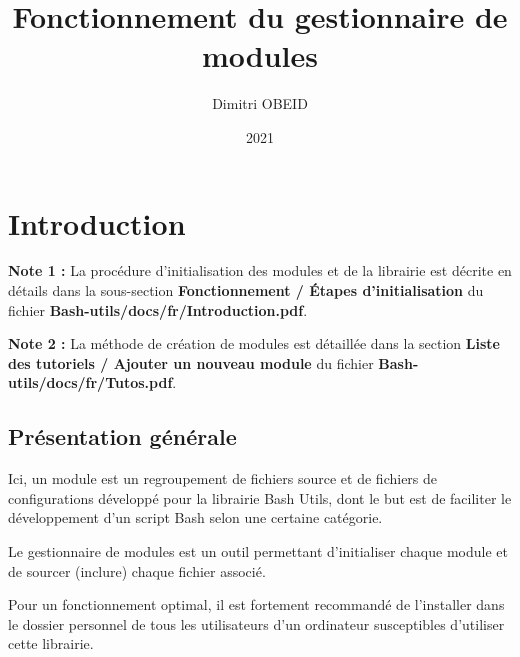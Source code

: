 \documentclass[a4paper,10pt]{article}
\title{\color{red}Fonctionnement du gestionnaire de modules}\color{white}
\author{Dimitri OBEID}
\date{2021}
\begin{document}
\maketitle
\tableofcontents
\newpage

\color{red}
\section{Introduction}\color{white}

\begin{justify}
    \textbf{Note 1 :} La procédure d'initialisation des modules et de la librairie est décrite en détails dans la sous-section \textbf{\color{red}Fonctionnement \color{white} / \color{green}Étapes d'initialisation\color{white}} du fichier \textbf{\color{lime}Bash-utils/docs/fr/Introduction.pdf\color{white}}.
\end{justify}
 
 \begin{justify}
    \textbf{Note 2 :} La méthode de création de modules est détaillée dans la section \textbf{\color{red}Liste des tutoriels \color{white} / \color{green}Ajouter un nouveau module} du fichier \textbf{\color{lime}Bash-utils/docs/fr/Tutos.pdf}.
 \end{justify}

\color{green}
\subsection{Présentation générale}\color{white}

\begin{justify}
    Ici, un module est un regroupement de fichiers source et de fichiers de configurations développé pour la librairie Bash Utils, dont le but est de faciliter le développement d'un script Bash selon une certaine catégorie.
\end{justify}

\begin{justify}
    Le gestionnaire de modules est un outil permettant d'initialiser chaque module et de sourcer (inclure) chaque fichier associé.
\end{justify}

\begin{justify}
    Pour un fonctionnement optimal, il est fortement recommandé de l'installer dans le dossier personnel de tous les utilisateurs d'un ordinateur susceptibles d'utiliser cette librairie.
\end{justify}
\end{document}
